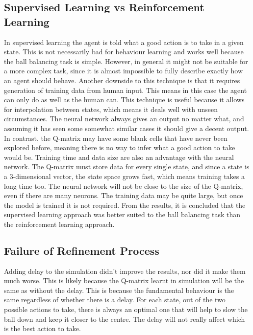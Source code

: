 \documentclass[12pt,a4paper]{article}
\begin{document}
\subsection{Supervised Learning vs Reinforcement Learning}
In supervised learning the agent is told what a good action is to take in a given state. This is not necessarily bad for behaviour learning and works well because the ball balancing task is simple. However, in general it might not be suitable for a more complex task, since it is almost impossible to fully describe exactly how an agent should behave. Another downside to this technique is that it requires generation of training data from human input. This means in this case the agent can only do as well as the human can. 
This technique is useful because it allows for interpolation between states, which means it deals well with unseen circumstances. The neural network always gives an output no matter what, and assuming it has seen some somewhat similar cases it should give a decent output. In contrast, the Q-matrix may have some blank cells that have never been explored before, meaning there is no way to infer what a good action to take would be. Training time and data size are also an advantage with the neural network. The Q-matrix must store data for every single state, and since a state is a 3-dimensional vector, the state space grows fast, which means training takes a long time too. The neural network will not be close to the size of the Q-matrix, even if there are many neurons. The training data may be quite large, but once the model is trained it is not required. 
From the results, it is concluded that the supervised learning approach was better suited to the ball balancing task than the reinforcement learning approach. 

\subsection{Failure of Refinement Process}
Adding delay to the simulation didn't improve the results, nor did it make them much worse. This is likely because the Q-matrix learnt in simulation will be the same as without the delay. This is because the fundamental behaviour is the same regardless of whether there is a delay. For each state, out of the two possible actions to take, there is always an optimal one that will help to slow the ball down and keep it closer to the centre. The delay will not really affect which is the best action to take.
\end{document}
